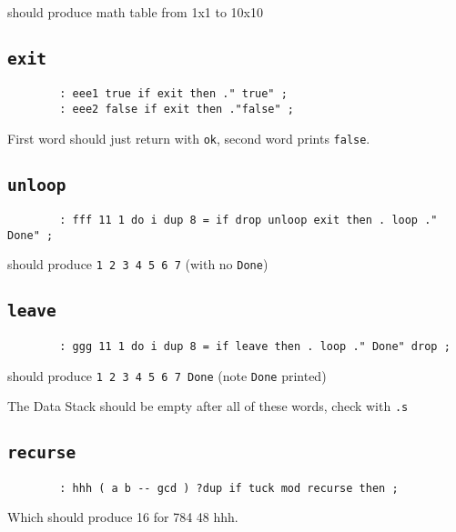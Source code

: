 \noindent should produce math table from 1x1 to 10x10


\subsection{\texttt{exit}}

\begin{lstlisting}
        : eee1 true if exit then ." true" ; 
        : eee2 false if exit then ."false" ; 
\end{lstlisting}

\noindent First word should just return with \texttt{ok}, second word prints \texttt{false}.


\subsection{\texttt{unloop}}

\begin{lstlisting}
        : fff 11 1 do i dup 8 = if drop unloop exit then . loop ." Done" ; 
\end{lstlisting}

\noindent should produce \texttt{1 2 3 4 5 6 7} (with no \texttt{Done})


\subsection{\texttt{leave}}

\begin{lstlisting}
        : ggg 11 1 do i dup 8 = if leave then . loop ." Done" drop ; 
\end{lstlisting}

\noindent should produce \texttt{1 2 3 4 5 6 7 Done} (note \texttt{Done} printed)

The Data Stack should be empty after all of these words, check with \texttt{.s}


\subsection{\texttt{recurse}}

\begin{lstlisting}
        : hhh ( a b -- gcd ) ?dup if tuck mod recurse then ;
\end{lstlisting}

\noindent Which should produce 16 for 784 48 hhh. 


